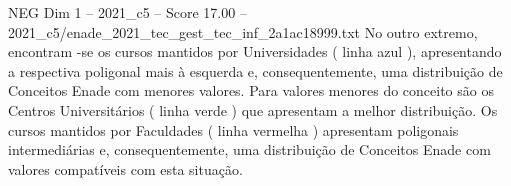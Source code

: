 \begin{textsample}{NEG Dim 1 – 2021\_c5 – Score 17.00 – 2021\_c5/enade\_2021\_tec\_gest\_tec\_inf\_2a1ac18999.txt}
No outro extremo, encontram -se os cursos mantidos por Universidades ( linha azul ), apresentando a respectiva poligonal mais à esquerda e, consequentemente, uma distribuição de Conceitos Enade com menores valores.
Para valores menores do conceito são os Centros Universitários ( linha verde ) que apresentam a melhor distribuição.
Os cursos mantidos por Faculdades ( linha vermelha ) apresentam poligonais intermediárias e, consequentemente, uma distribuição de Conceitos Enade com valores compatíveis com esta situação.

\end{textsample}
